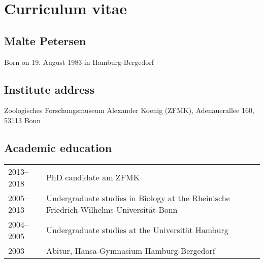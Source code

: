 \chapter*{Curriculum vitae}

\section*{Malte Petersen}

Born on 19. August 1983 in Hamburg-Bergedorf

\section*{Institute address}

Zoologisches Forschungsmuseum Alexander Koenig (ZFMK), Adenauerallee 160, 53113 Bonn

\section*{Academic education}

\begin{tabular}[h]{l l}
2013--2018 & PhD candidate am ZFMK \\
2005--2013 & Undergraduate studies in Biology at the Rheinische Friedrich-Wilhelms-Universität Bonn\\
2004--2005 & Undergraduate studies at the Universität Hamburg\\
2003       & Abitur, Hansa-Gymnasium Hamburg-Bergedorf \\
\end{tabular}
